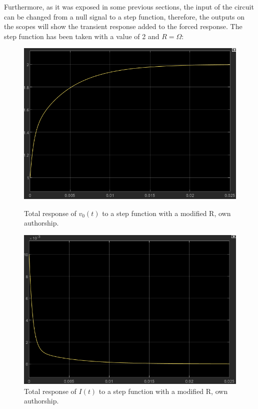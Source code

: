\documentclass[a4paper,12pt]{article}
\begin{document}
\vspace{0.5cm}

Furthermore, as it was exposed in some previous sections, the input of the circuit can be changed from a null signal to a step function, therefore, the outputs on the scopes will show the transient response added to the forced response. The step function has been taken with a value of 2 and $R = \Omega$:

\vspace{0.5cm}

\begin{figure}[H]
    \centering
    \begin{minipage}[b]{0.45\linewidth}
        \centering
        \includegraphics[width=\linewidth]{fonts_lab_2/scope_v_step.png}
        \caption{Total response of $v_0(t)$ to a step function with a modified R, own authorship.}
        \label{fig:scopevstep}
    \end{minipage}
    \hspace{0.05\linewidth} %
    \begin{minipage}[b]{0.45\linewidth}
        \centering
        \includegraphics[width=\linewidth]{fonts_lab_2/scope_i_step.png}
        \caption{Total response of $I(t)$ to a step function with a modified R, own authorship.}
        \label{fig:scopeistep}
    \end{minipage}
\end{figure}
\end{document}
